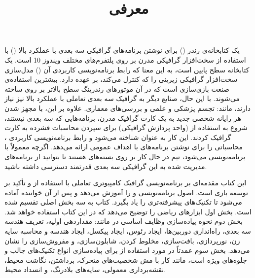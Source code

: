 \newpage

\textbf{\vspace{80pt}}
\title{
    \BTitr
    \center \Huge
    \begin{flushright}
        \textbf{معرفی}
    \end{flushright}
}
\textbf{\vspace{80pt}}

{
    \Large
    \begin{spacing}{1.5}
         یک کتابخانه‌ی رندر () برای نوشتن برنامه‌های گرافیکی سه بعدی با عملکرد بالا () با استفاده از سخت‌افزار گرافیکی مدرن بر روی پلتفرم‌های مختلف ویندوز 10  است.
         یک کتابخانه سطح پایین است، به این معنا که رابط برنامه‌نویسی کاربردی آن () مدل‌سازی سخت‌افزار گرافیکی زیرینی را که کنترل می‌کند، بر عهده دارد.
        بیشترین استفاده‌ی  صنعت بازی‌سازی است که در آن موتور‌های رندرینگ سطح بالاتر بر روی  ساخته می‌شوند.
        با این حال، صنایع دیگر به گرافیک سه بعدی تعاملی با عملکرد بالا نیز نیاز دارند، مانند: تجسم پزشکی و علمی و بررسی‌های معماری.
        علاوه بر این، با مجهز شدن هر رایانه شخصی جدید به یک کارت گرافیک مدرن، برنامه‌هایی که سه بعدی نیستند، شروع به استفاده از  (واحد پردازش گرافیکی) برای سپردن محاسبات فشرده به کارت گرافیک کردند.
        این کار به عنوان  شناخته می‌شود و رابط برنامه‌نویسی کاربردی ،  محاسباتی را برای نوشتن برنامه‌های  با اهداف عمومی ارائه می‌دهد.
        اگرچه  معمولاً با  برنامه‌نویسی می‌شود، تیم  در حال کار بر روی بسته‌های  هستند تا بتوانید از برنامه‌های مدیریت شده به این  گرافیکی سه بعدی قدرتمند دسترسی داشته باشید.
    \end{spacing}
}
{
    \Large
    \begin{spacing}{1.5}
        این کتاب مقدمه‌ای بر برنامه‌نویسی گرافیک کامپیوتری تعاملی با استفاده از  و تأکید بر توسعه بازی است. اصول برنامه‌نویسی  و  را آموزش می‌دهد و پس از آن خواننده آماده می‌شود تا تکنیک‌های پیشرفته‌تری را یاد بگیرد.
        کتاب به سه بخش اصلی تقسیم شده است. بخش اول ابزار‌های ریاضی را توضیح می‌دهد که در این کتاب استفاده خواهد شد.
        بخش دوم نحوه پیاده‌سازی وظایف اساسی در  مانند: مقداردهی اولیه، تعریف هندسه سه بعدی، راه‌اندازی دوربین‌ها، ایجاد رئوس، ایجاد پیکسل، ایجاد هندسه و محاسبه سایه زن، نورپردازی، بافت‌سازی، مخلوط کردن، شابلون‌سازی، و مفروش‌سازی را نشان می‌دهد.
        بخش سوم عمدتاً در مورد استفاده از  برای پیاده‌سازی انواع تکنیک‌های جالب و جلوه‌های ویژه است، مانند کار با مش شخصیت‌های متحرک، برداشتن، نگاشت محیط، نقشه‌برداری معمولی، سایه‌های بلادرنگ، و انسداد محیط.
    \end{spacing}
}
